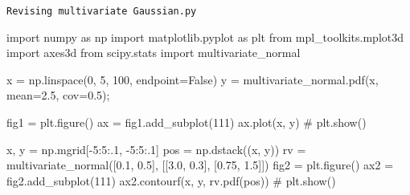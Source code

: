 \documentclass[
  letterpaper,
  DIV=11,
  numbers=noendperiod]{scrreprt}
\newenvironment{Shaded}{\begin{snugshade}}{\end{snugshade}}
\newcommand{\CommentTok}[1]{\textcolor[rgb]{0.37,0.37,0.37}{#1}}
\newcommand{\DecValTok}[1]{\textcolor[rgb]{0.68,0.00,0.00}{#1}}
\newcommand{\FloatTok}[1]{\textcolor[rgb]{0.68,0.00,0.00}{#1}}
\newcommand{\ImportTok}[1]{\textcolor[rgb]{0.00,0.46,0.62}{#1}}
\newcommand{\NormalTok}[1]{\textcolor[rgb]{0.00,0.23,0.31}{#1}}
\newcommand{\OperatorTok}[1]{\textcolor[rgb]{0.37,0.37,0.37}{#1}}
\newcommand{\VariableTok}[1]{\textcolor[rgb]{0.07,0.07,0.07}{#1}}
\theoremstyle{plain}
\theoremstyle{definition}
\theoremstyle{remark}
\begin{document}
\begin{codelisting}

\caption{\texttt{Revising multivariate Gaussian.py}}

\begin{Shaded}
\begin{Highlighting}[]
\ImportTok{import}\NormalTok{ numpy }\ImportTok{as}\NormalTok{ np}
\ImportTok{import}\NormalTok{ matplotlib.pyplot }\ImportTok{as}\NormalTok{ plt}
\ImportTok{from}\NormalTok{ mpl\_toolkits.mplot3d }\ImportTok{import}\NormalTok{ axes3d}
\ImportTok{from}\NormalTok{ scipy.stats }\ImportTok{import}\NormalTok{ multivariate\_normal}

\NormalTok{x }\OperatorTok{=}\NormalTok{ np.linspace(}\DecValTok{0}\NormalTok{, }\DecValTok{5}\NormalTok{, }\DecValTok{100}\NormalTok{, endpoint}\OperatorTok{=}\VariableTok{False}\NormalTok{)}
\NormalTok{y }\OperatorTok{=}\NormalTok{ multivariate\_normal.pdf(x, mean}\OperatorTok{=}\FloatTok{2.5}\NormalTok{, cov}\OperatorTok{=}\FloatTok{0.5}\NormalTok{)}\OperatorTok{;}

\NormalTok{fig1 }\OperatorTok{=}\NormalTok{ plt.figure()}
\NormalTok{ax }\OperatorTok{=}\NormalTok{ fig1.add\_subplot(}\DecValTok{111}\NormalTok{)}
\NormalTok{ax.plot(x, y)}
\CommentTok{\# plt.show()}

\NormalTok{x, y }\OperatorTok{=}\NormalTok{ np.mgrid[}\OperatorTok{{-}}\DecValTok{5}\NormalTok{:}\DecValTok{5}\NormalTok{:}\FloatTok{.1}\NormalTok{, }\OperatorTok{{-}}\DecValTok{5}\NormalTok{:}\DecValTok{5}\NormalTok{:}\FloatTok{.1}\NormalTok{]}
\NormalTok{pos }\OperatorTok{=}\NormalTok{ np.dstack((x, y))}
\NormalTok{rv }\OperatorTok{=}\NormalTok{ multivariate\_normal([}\FloatTok{0.1}\NormalTok{, }\FloatTok{0.5}\NormalTok{], [[}\FloatTok{3.0}\NormalTok{, }\FloatTok{0.3}\NormalTok{], [}\FloatTok{0.75}\NormalTok{, }\FloatTok{1.5}\NormalTok{]])}
\NormalTok{fig2 }\OperatorTok{=}\NormalTok{ plt.figure()}
\NormalTok{ax2 }\OperatorTok{=}\NormalTok{ fig2.add\_subplot(}\DecValTok{111}\NormalTok{)}
\NormalTok{ax2.contourf(x, y, rv.pdf(pos))}
\CommentTok{\# plt.show()}


\end{Highlighting}
\end{Shaded}
\end{codelisting}
\end{document}
